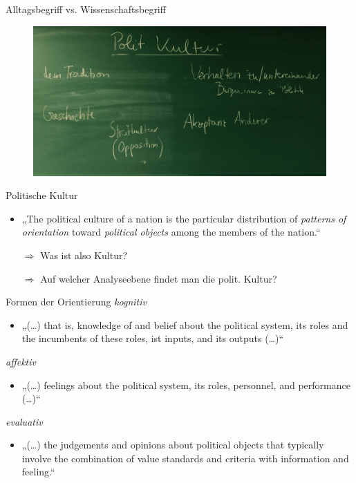 \documentclass[11pt]{beamer}
\begin{document}
\begin{frame}{Alltagsbegriff vs. Wissenschaftsbegriff}
	\begin{figure}[ht]
		\includegraphics[width=\textwidth]{pics/s3-1.png}
		\caption{}
	\end{figure}

\end{frame}

\begin{frame}[t]{Politische Kultur}
	 \pause
	\begin{itemize}
		\item „The political culture of a nation is the particular distribution of \textit{patterns of orientation} toward \textit{political objects} among the members of the nation.“ \parencite[14]{Almond1963}	\pause
		\item[$\Rightarrow$] Was ist also Kultur? \pause
		\item[$\Rightarrow$] Auf welcher Analyseebene findet man die polit. Kultur?
	\end{itemize}
\end{frame}

\begin{frame}[t]{Formen der Orientierung}
	\textit{kognitiv} \pause
	\begin{itemize}
		\item „(…) that is, knowledge of and belief about the political system, its roles and the incumbents of these roles, ist inputs, and its outputs (…)“ \parencite[15]{Almond1963} \pause
	\end{itemize}
	
	\textit{affektiv} \pause
	\begin{itemize}
		\item „(…) feelings about the political system, its roles, personnel, and performance (…)“ \parencite[15]{Almond1963} \pause
	\end{itemize}
	
	\textit{evaluativ} \pause
	\begin{itemize}
		\item „(…) the judgements and opinions about political objects that typically involve the combination of value standards and criteria with information and feeling.“ \parencite[15]{Almond1963} \pause
	\end{itemize}
\end{frame}
\end{document}
